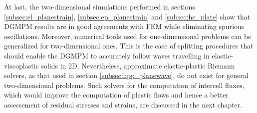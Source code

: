 At last, the two-dimensional simulations performed in sections \ref{subsec:el_planestrain}, \ref{subsec:ep_planestrain} and \ref{subsec:he_plate} show that DGMPM results are in good agreements with FEM while eliminating spurious oscillations.
Moreover, numerical tools used for one-dimensional problems can be generalized for two-dimensional ones. This is the case of splitting procedures that should enable the DGMPM to accurately follow waves travelling in elastic-viscoplastic solids in 2D. Nevertheless, approximate elastic-plastic Riemann solvers, as that used in section \ref{subsec:hpp_planewave}, do not exist for general two-dimensional problems. Such solvers for the computation of intercell fluxes, which would improve the computation of plastic flows and hence a better assessement of residual stresses and strains, are discussed in the next chapter. 



